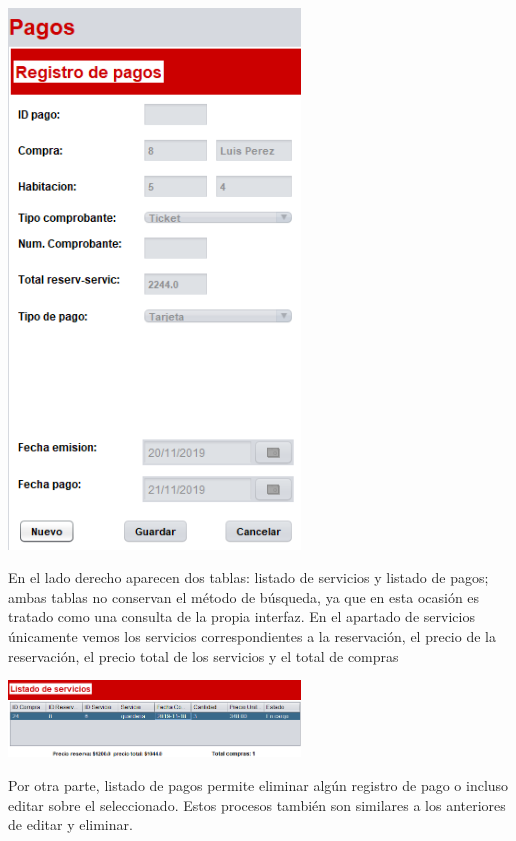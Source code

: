 \documentclass[12pt]{article}
\begin{document}
\begin{flushleft}
\vspace{0.5cm}
\begin{center}
\includegraphics[width=7.75cm]{re_pagos.png}
\end{center}

\vspace{0.5cm}
\textsf{En el lado derecho aparecen dos tablas: listado de servicios y listado de pagos; ambas tablas no conservan el método de búsqueda, ya que en esta ocasión es tratado como una consulta de la propia interfaz. En el apartado de servicios únicamente vemos los servicios correspondientes a la reservación, el precio de la reservación, el precio total de los servicios y  el total de compras}

\vspace{0.5cm}
\begin{center}
\includegraphics[width=7.75cm]{serv.png}
\end{center}

\vspace{0.5cm}
\textsf{Por otra parte, listado de pagos permite eliminar algún registro de pago o incluso editar sobre el seleccionado. Estos procesos también son similares a los anteriores de editar y eliminar.}


\end{flushleft}
\end{document}
